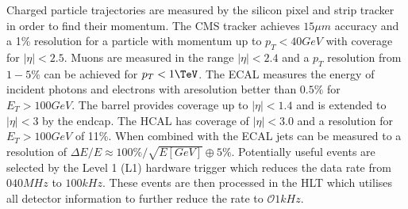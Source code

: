 Charged particle trajectories are measured by the silicon pixel and strip tracker \cite{siliconTDR} in order to find their momentum. The CMS tracker achieves $15\mu m$ accuracy and a 1\% resolution for a particle with momentum up to $p_T < 40GeV$ with coverage for $|\eta|<2.5$. Muons are measured in the range $|\eta|<2.4$ and a $p_T$ resolution from $1-5\%$ can be achieved for $p_T < 1\tev$. The ECAL measures the energy of incident photons and electrons with aresolution better than $0.5\%$ for $E_T > 100 GeV$. The barrel provides coverage up to $|\eta| < 1.4$ and is extended to $|\eta|<3$ by the endcap. The HCAL has coverage of $|\eta|<3.0$ \cite{hcal} and a resolution for $E_T > 100GeV$ of 11\%. When combined with the ECAL jets can be measured to a resolution of $\Delta E/E \approx 100 \%/\sqrt{E[GeV]} \oplus 5\%$.
Potentially useful events are selected by the Level 1 (L1) hardware trigger which reduces the data rate from $\mathcal{0}40MHz$ to $100kHz$. These events are then processed in the HLT which utilises all detector information to further reduce the rate to $\mathcal{O}1kHz$.
